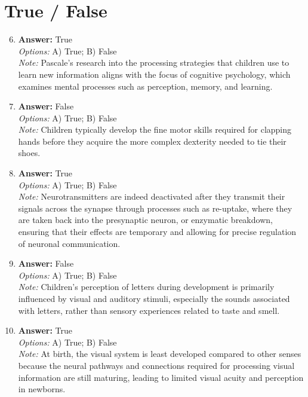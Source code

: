 \documentclass[12pt]{article}
\begin{document}
\section*{True / False}
\begin{enumerate}[label=\arabic*.]
\setcounter{enumi}{5}
\item \textbf{Answer:} True
\\ \textit{Options:} A) True; B) False
\\ \textit{Note:} Pascale's research into the processing strategies that children use to learn new information aligns with the focus of cognitive psychology, which examines mental processes such as perception, memory, and learning.
\item \textbf{Answer:} False
\\ \textit{Options:} A) True; B) False
\\ \textit{Note:} Children typically develop the fine motor skills required for clapping hands before they acquire the more complex dexterity needed to tie their shoes.
\item \textbf{Answer:} True
\\ \textit{Options:} A) True; B) False
\\ \textit{Note:} Neurotransmitters are indeed deactivated after they transmit their signals across the synapse through processes such as re-uptake, where they are taken back into the presynaptic neuron, or enzymatic breakdown, ensuring that their effects are temporary and allowing for precise regulation of neuronal communication.
\item \textbf{Answer:} False
\\ \textit{Options:} A) True; B) False
\\ \textit{Note:} Children's perception of letters during development is primarily influenced by visual and auditory stimuli, especially the sounds associated with letters, rather than sensory experiences related to taste and smell.
\item \textbf{Answer:} True
\\ \textit{Options:} A) True; B) False
\\ \textit{Note:} At birth, the visual system is least developed compared to other senses because the neural pathways and connections required for processing visual information are still maturing, leading to limited visual acuity and perception in newborns.
\end{enumerate}
\end{document}
